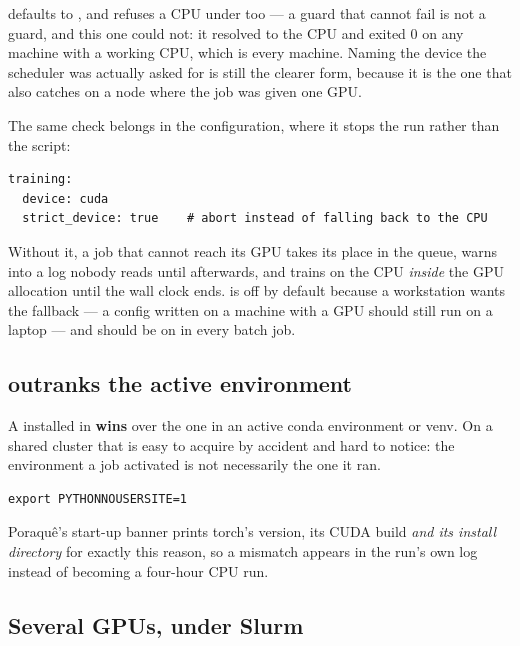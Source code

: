  defaults to , and  refuses a CPU under
 too --- a guard that cannot fail is not a guard, and this one could
not: it resolved to the CPU and exited 0 on any machine with a working CPU,
which is every machine. Naming the device the scheduler was actually asked for
is still the clearer form, because it is the one that also catches
 on a node where the job was given one GPU.

The same check belongs in the configuration, where it stops the run rather than
the script:

\begin{lstlisting}
training:
  device: cuda
  strict_device: true    # abort instead of falling back to the CPU
\end{lstlisting}

\begin{pnote}
Without it, a job that cannot reach its GPU takes its place in the queue, warns
into a log nobody reads until afterwards, and trains on the CPU \emph{inside}
the GPU allocation until the wall clock ends.  is off by
default because a workstation wants the fallback --- a config written on a
machine with a GPU should still run on a laptop --- and should be on in every
batch job.
\end{pnote}

\subsection{ outranks the active environment}

A  installed in 
\textbf{wins} over the one in an active conda environment or venv. On a shared
cluster that is easy to acquire by accident and hard to notice: the environment
a job activated is not necessarily the one it ran.

\begin{lstlisting}
export PYTHONNOUSERSITE=1
\end{lstlisting}

Poraqu\^e's start-up banner prints torch's version, its CUDA build \emph{and its
install directory} for exactly this reason, so a mismatch appears in the run's
own log instead of becoming a four-hour CPU run.

\subsection{Several GPUs, under Slurm}
\label{sec:multigpu}

